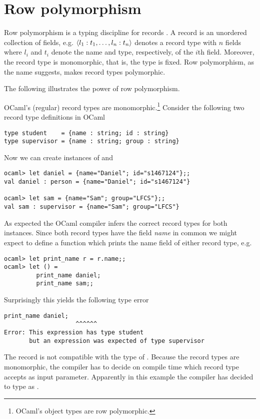 \section{Row polymorphism}
Row polymorphism is a typing discipline for records \cite{Remy1993}. A record is an unordered collection of fields, e.g. $\langle l_1 : t_1,\dots,l_n : t_n \rangle$ denotes a record type with $n$ fields where $l_i$ and $t_i$ denote the name and type, respectively, of the $i$th field. Moreover, the record type is monomorphic, that is, the type is fixed. Row polymorphism, as the name suggests, makes record types polymorphic.

The following illustrates the power of row polymorphism.
\begin{example}
OCaml's (regular) record types are monomorphic.\footnote{OCaml's object types are row polymorphic.} Consider the following two record type definitions in OCaml
\begin{lstlisting}[style=ocaml]
type student    = {name : string; id : string}
type supervisor = {name : string; group : string} 
\end{lstlisting}
Now we can create instances of  and 
\begin{lstlisting}[style=ocaml]
ocaml> let daniel = {name="Daniel"; id="s1467124"};;
val daniel : person = {name="Daniel"; id="s1467124"}

ocaml> let sam = {name="Sam"; group="LFCS"};;
val sam : supervisor = {name="Sam"; group="LFCS"}
\end{lstlisting}
As expected the OCaml compiler infers the correct record types for both instances. Since both record types have the field \emph{name} in common we might expect to define a function which prints the name field of either record type, e.g.
\begin{lstlisting}[style=ocaml]
ocaml> let print_name r = r.name;;
ocaml> let () = 
         print_name daniel;
         print_name sam;;
\end{lstlisting}
Surprisingly this yields the following type error
\begin{lstlisting}[style=ocaml]
         print_name daniel;
                    ^^^^^^
Error: This expression has type student
       but an expression was expected of type supervisor
\end{lstlisting}
The record  is not compatible with the type of . Because the record types are monomorphic, the compiler has to decide on compile time which record type  accepts as input parameter. Apparently in this example the compiler has decided to type  as .


\end{example}
